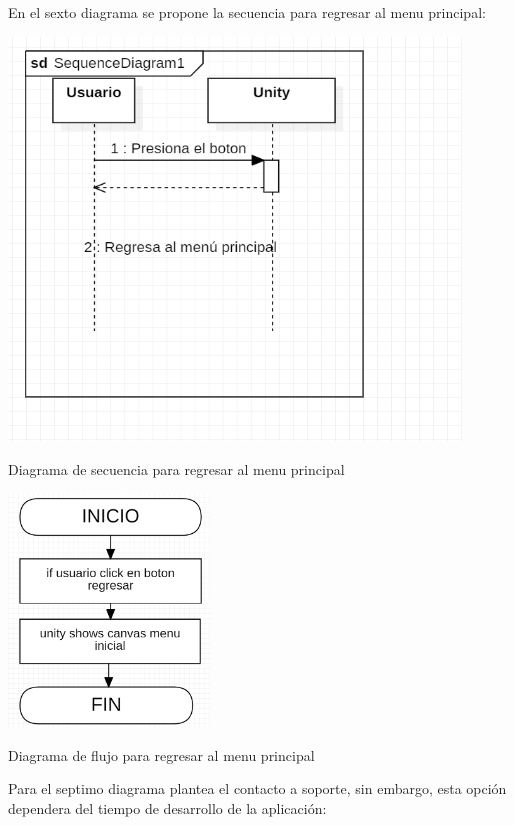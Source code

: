 \documentclass[12pt, oneside, letterpaper]{book}
\begin{document}
\bigskip
\fontsize{14}{18}\selectfont
\par 
En el sexto diagrama se propone la secuencia para regresar al menu principal:

\begin{center}
	\centering
		\includegraphics[width=0.9\textwidth]{DSFNRegresarAMenu.png}

	\caption{Diagrama de secuencia para regresar al menu principal}
	\label{DSFNRegresarAMenu}
\end{center}


\begin{center}
	\centering
		\includegraphics[width=0.4\textwidth]{DFFNRegresarAMenu.png}

	\caption{Diagrama de flujo para regresar al menu principal}
	\label{DFFNRegresarAMenu}
\end{center}


\bigskip
\fontsize{14}{18}\selectfont
\par 
Para el septimo diagrama plantea el contacto a soporte, sin embargo, esta opción dependera del tiempo de desarrollo de la aplicación:
\end{document}
